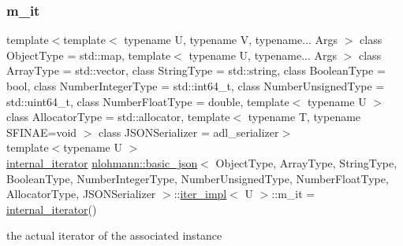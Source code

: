 \subsubsection{\texorpdfstring{m\+\_\+it}{m\_it}}
{\footnotesize\ttfamily template$<$template$<$ typename U, typename V, typename... Args $>$ class Object\+Type = std\+::map, template$<$ typename U, typename... Args $>$ class Array\+Type = std\+::vector, class String\+Type  = std\+::string, class Boolean\+Type  = bool, class Number\+Integer\+Type  = std\+::int64\+\_\+t, class Number\+Unsigned\+Type  = std\+::uint64\+\_\+t, class Number\+Float\+Type  = double, template$<$ typename U $>$ class Allocator\+Type = std\+::allocator, template$<$ typename T, typename S\+F\+I\+N\+A\+E=void $>$ class J\+S\+O\+N\+Serializer = adl\+\_\+serializer$>$ \\
template$<$typename U $>$ \\
\hyperlink{structnlohmann_1_1basic__json_1_1internal__iterator}{internal\+\_\+iterator} \hyperlink{classnlohmann_1_1basic__json}{nlohmann\+::basic\+\_\+json}$<$ Object\+Type, Array\+Type, String\+Type, Boolean\+Type, Number\+Integer\+Type, Number\+Unsigned\+Type, Number\+Float\+Type, Allocator\+Type, J\+S\+O\+N\+Serializer $>$\+::\hyperlink{classnlohmann_1_1basic__json_1_1iter__impl}{iter\+\_\+impl}$<$ U $>$\+::m\+\_\+it = \hyperlink{structnlohmann_1_1basic__json_1_1internal__iterator}{internal\+\_\+iterator}()\hspace{0.3cm}{\ttfamily [private]}}



the actual iterator of the associated instance 

\mbox{\label{classnlohmann_1_1basic__json_1_1iter__impl_a252df5be3fdd0b6aaa770b5929c7addc}} 
